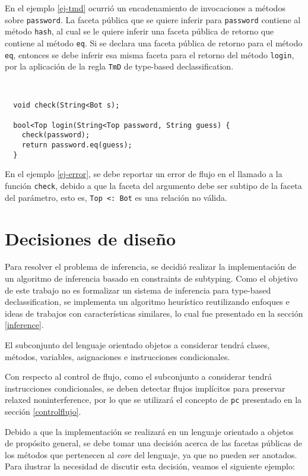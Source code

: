 En el ejemplo \ref{ej-tmd} ocurrió un encadenamiento de invocaciones a métodos sobre \texttt{password}. La faceta pública que se quiere inferir para \texttt{password} contiene al método \texttt{hash}, al cual se le quiere inferir una faceta pública de retorno que contiene al método \texttt{eq}. Si se declara una faceta pública de retorno para el método \texttt{eq}, entonces se debe inferir esa misma faceta para el retorno del método \texttt{login}, por la aplicación de la regla \texttt{TmD} de type-based declassification.

\begin{ej} \ \\
  \label{ej-error}
  \normalfont
\begin{lstlisting}
  void check(String<Bot s);

  bool<Top login(String<Top password, String guess) {
    check(password);
    return password.eq(guess);
  }
\end{lstlisting}
\end{ej}

En el ejemplo \ref{ej-error}, se debe reportar un error de flujo en el llamado a la función \texttt{check}, debido a que la faceta del argumento debe ser subtipo de la faceta del parámetro, esto es, \texttt{Top <: Bot} es una relación no válida.

\section{Decisiones de diseño}
Para resolver el problema de inferencia, se decidió realizar la implementación de un algoritmo de inferencia basado en constraints de subtyping. Como el objetivo de este trabajo no es formalizar un sistema de inferencia para type-based declassification, se implementa un algoritmo heurístico reutilizando enfoques e ideas de trabajos con características similares, lo cual fue presentado en la sección \ref{inference}.

El subconjunto del lenguaje orientado objetos a considerar tendrá clases, métodos, variables, asignaciones e instrucciones condicionales.

Con respecto al control de flujo, como el subconjunto a considerar tendrá instrucciones condicionales, se deben detectar flujos implícitos para preservar relaxed noninterference, por lo que se utilizará el concepto de \texttt{pc} presentado en la sección \ref{controlflujo}.

Debido a que la implementación se realizará en un lenguaje orientado a objetos de propósito general, se debe tomar una decisión acerca de las facetas públicas de los métodos que pertenecen al \emph{core} del lenguaje, ya que no pueden ser anotados. Para ilustrar la necesidad de discutir esta decisión, veamos el siguiente ejemplo:

